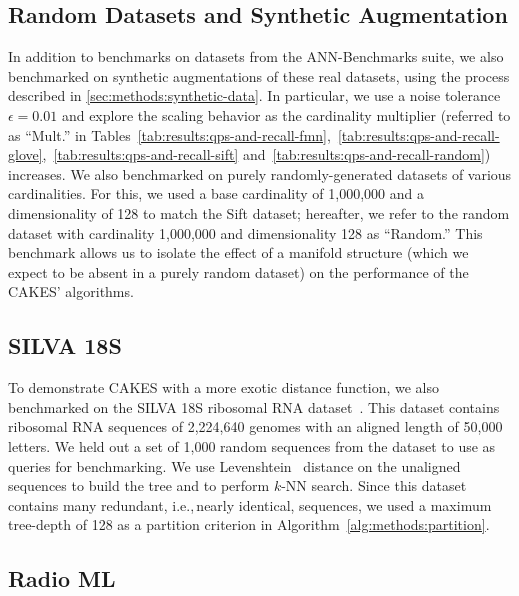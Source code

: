 \subsection{Random Datasets and Synthetic Augmentation}
\label{sec:datasets-and-benchmarks:random-datasets}

In addition to benchmarks on datasets from the ANN-Benchmarks suite, we also benchmarked on synthetic augmentations of these real datasets, using the process described in \ref{sec:methods:synthetic-data}.
In particular, we use a noise tolerance $\epsilon = 0.01$ and explore the scaling behavior as the cardinality multiplier (referred to as ``Mult.'' in Tables~\ref{tab:results:qps-and-recall-fmn},~\ref{tab:results:qps-and-recall-glove},~\ref{tab:results:qps-and-recall-sift} and~\ref{tab:results:qps-and-recall-random}) increases.
We also benchmarked on purely randomly-generated datasets of various cardinalities.
For this, we used a base cardinality of 1,000,000 and a dimensionality of 128 to match the Sift dataset; hereafter, we refer to the random dataset with cardinality 1,000,000 and dimensionality 128 as ``Random.''
This benchmark allows us to isolate the effect of a manifold structure (which we expect to be absent in a purely random dataset) on the performance of the CAKES' algorithms.


\subsection{SILVA 18S}
\label{sec:datasets-and-benchmarks:silva-18s}

To demonstrate CAKES with a more exotic distance function, we also benchmarked on the SILVA 18S ribosomal RNA dataset~\cite{10.1093/nar/gks1219}.
This dataset contains ribosomal RNA sequences of 2,224,640 genomes with an aligned length of 50,000 letters.
We held out a set of 1,000 random sequences from the dataset to use as queries for benchmarking.
We use Levenshtein~\cite{levenshtein1966binary} distance on the unaligned sequences to build the tree and to perform $k$-NN search.
Since this dataset contains many redundant, i.e.,\,nearly identical, sequences, we used a maximum tree-depth of 128 as a partition criterion in Algorithm~\ref{alg:methods:partition}.


\subsection{Radio ML}
\label{sec:datasets-and-benchmarks:radio-ml}

